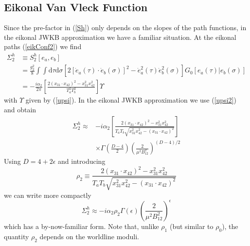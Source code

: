 \subsection{Eikonal Van Vleck Function}
Since the pre-factor in (\ref{Sh}) only depends on the slopes of the path functions, in the eikonal JWKB approximation we have a familiar situation. At the eikonal paths (\ref{eikConf2}) we find
\begin{align}
	\Sigma_{2}^{h} &\equiv S_{2}^{h}\left[e_{a}, e_{b} \right] \nonumber \\
	&= \frac{g_{2}^{2}}{8} \int \int \mathrm{d}\tau \mathrm{d}\sigma \left[ 2 \left[ \dot{e}_{a}(\tau) \cdot \dot{e}_{b}(\sigma) \right]^{2} - \dot{e}_{a}^{2}(\tau) \dot{e}_{b}^{2}(\sigma) \right] G_{0}\left[e_{a}(\tau) | e_{b}(\sigma) \right] \nonumber \\
	&= -\frac{i \alpha_{2}}{2 \pi} \left[ \frac{2(x_{31} \cdot x_{42})^{2} - x_{31}^{2} x_{42}^{2}}{T_{a}^{2} T_{b}^{2}} \right] \Upsilon
\end{align}
with $\Upsilon$ given by (\ref{upsi}). In the eikonal JWKB approximation we use (\ref{upsi2}) and obtain
\begin{equation}
\begin{split}
	\Sigma_{2}^{h} \approx {}&{- i \alpha_{2}} \left[ \frac{2(x_{31} \cdot x_{42})^{2} - x_{31}^{2} x_{42}^{2}}{T_{a} T_{b} \sqrt{x_{31}^{2} x_{42}^{2} - (x_{31} \cdot x_{42})^{2}} } \right] \\
	&\times \Gamma\left( \frac{D - 4}{2} \right) \left( \frac{2}{\mu^{2} B_{12}^{2}} \right)^{(D - 4)/2}
\end{split}
\end{equation}
Using $D = 4 + 2 \epsilon$ and introducing
\begin{equation}
	\rho_{2} \equiv \frac{2(x_{31} \cdot x_{42})^{2} - x_{31}^{2} x_{42}^{2}}{T_{a} T_{b} \sqrt{x_{31}^{2} x_{42}^{2} - (x_{31} \cdot x_{42})^{2}} } \label{rho2Def}
\end{equation}
we can write more compactly
\begin{equation}
	\Sigma_{2}^{h} \approx -i \alpha_{2} \rho_{2} \Gamma(\epsilon) \left( \frac{2}{\mu^{2} B_{12}^{2}} \right)^{\epsilon}
\end{equation}
which has a by-now-familiar form. Note that, unlike $\rho_{1}$ (but similar to $\rho_{0}$), the quantity $\rho_{2}$ depends on the worldline moduli.
